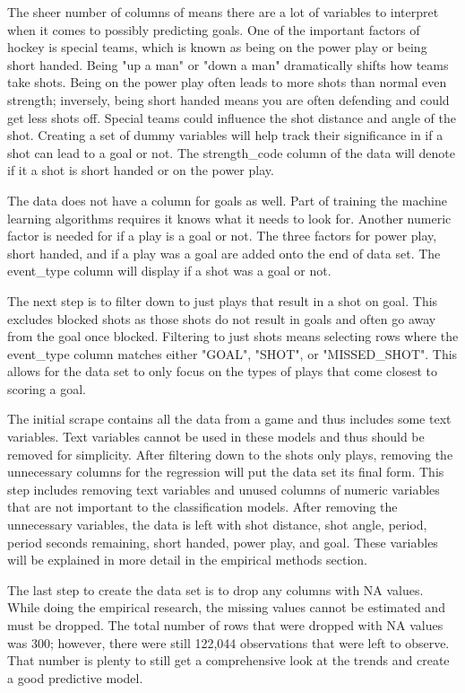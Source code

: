 \documentclass[12pt,english]{article}
\begin{document}
The sheer number of columns of means there are a lot of variables to interpret when it comes to possibly predicting goals. One of the important factors of hockey is special teams, which is known as being on the power play or being short handed. Being "up a man" or "down a man" dramatically shifts how teams take shots. Being on the power play often leads to more shots than normal even strength; inversely, being short handed means you are often defending and could get less shots off. Special teams could influence the shot distance and angle of the shot. Creating a set of dummy variables will help track their significance in if a shot can lead to a goal or not. The strength\_code column of the data will denote if it a shot is short handed or on the power play. 

The data does not have a column for goals as well. Part of training the machine learning algorithms requires it knows what it needs to look for. Another numeric factor is needed for if a play is a goal or not. The three factors for power play, short handed, and if a play was a goal are added onto the end of data set. The event\_type column will display if a shot was a goal or not.

The next step is to filter down to just plays that result in a shot on goal. This excludes blocked shots as those shots do not result in goals and often go away from the goal once blocked. Filtering to just shots means selecting rows where the event\_type column matches either "GOAL", "SHOT", or "MISSED\_SHOT". This allows for the data set to only focus on the types of plays that come closest to scoring a goal. 

The initial scrape contains all the data from a game and thus includes some text variables. Text variables cannot be used in these models and thus should be removed for simplicity. After filtering down to the shots only plays, removing the unnecessary columns for the regression will put the data set its final form. This step includes removing text variables and unused columns of numeric variables that are not important to the classification models. After removing the unnecessary variables, the data is left with shot distance, shot angle, period, period seconds remaining, short handed, power play, and goal. These variables will be explained in more detail in the empirical methods section. 

The last step to create the data set is to drop any columns with NA values. While doing the empirical research, the missing values cannot be estimated and must be dropped. The total number of rows that were dropped with NA values was 300; however, there were still 122,044 observations that were left to observe. That number is plenty to still get a comprehensive look at the trends and create a good predictive model. 
\end{document}
